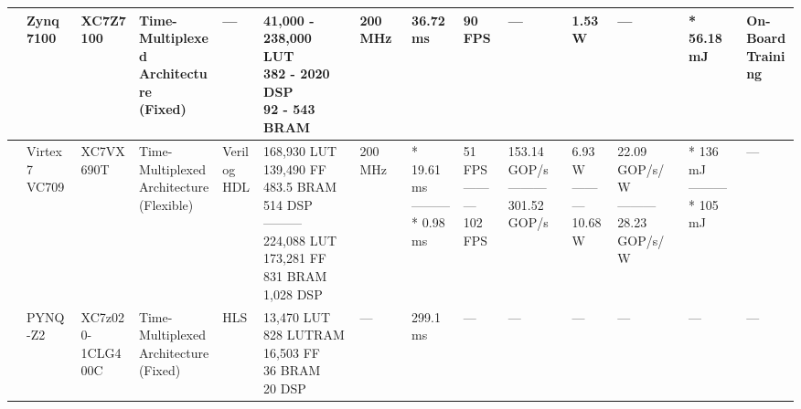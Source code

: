 \begin{center}
{\begin{tabular}{llllllllllllll}
\cite{mazouzOnlineContinualStreaming2024} & Zynq 7100 & XC7Z7100 & \makecell[tl]{Time-Multiplexed\\ Architecture\\ (Fixed)} & --- & \makecell[tl]{41,000 - 238,000 LUT\\ 382 - 2020 DSP\\ 92 - 543 BRAM} & 200 MHz & 36.72 ms & 90 FPS & --- & 1.53 W & --- & * 56.18 mJ & \makecell[tl]{On-Board\\ Training} \\ \hline
\cite{shaoConfigurableAcceleratorCNNBased2024} & \makecell[tl]{Virtex 7\\ VC709} & XC7VX690T & \makecell[tl]{Time-Multiplexed\\ Architecture\\ (Flexible)} & \makecell[tl]{Verilog\\ HDL} & \makecell[tl]{168,930 LUT\\ 139,490 FF\\ 483.5 BRAM\\ 514 DSP\\ ---------\\ 224,088 LUT\\ 173,281 FF\\ 831 BRAM\\ 1,028 DSP\\} & 200 MHz & \makecell[tl]{* 19.61 ms\\ ---------\\ * 0.98 ms} & \makecell[tl]{51 FPS\\ ---------\\ 102 FPS} & \makecell[tl]{153.14 GOP/s\\ ---------\\ 301.52 GOP/s} & \makecell[tl]{6.93 W\\ ---------\\ 10.68 W} & \makecell[tl]{22.09 GOP/s/W\\ ---------\\ 28.23 GOP/s/W} & \makecell[tl]{* 136 mJ\\ ---------\\ * 105 mJ} & --- \\ \hline
\cite{kimFPGAAcceleratedCNNParallelized2024} & PYNQ-Z2 & \makecell[tl]{XC7z020-\\1CLG400C} & \makecell[tl]{Time-Multiplexed\\ Architecture\\ (Fixed)} & HLS & \makecell[tl]{13,470 LUT\\ 828 LUTRAM\\ 16,503 FF\\ 36 BRAM\\ 20 DSP} & --- & 299.1 ms & --- & --- & --- & --- & --- & --- \\ \hline

\end{tabular}}
\end{center}
